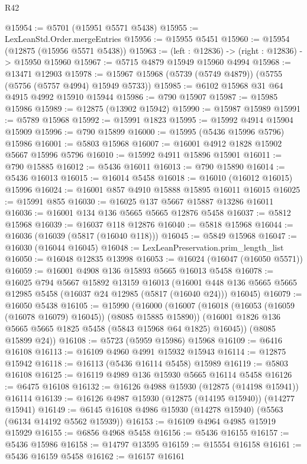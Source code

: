 \begin{lexlean}{R42}
\begin{coremodule}
@15954 := @5701 (@15951 @5571 @5438)
@15955 := LexLeanStd.Order.mergeEntries
@15956 := @15955 @5451
@15960 := @15954 (@12875 (@15956 @5571 @5438))
@15963 := (left : @12836) -> (right : @12836) -> @15950 @15960
@15967 := @5715 @4879 @15949 @15960 @4994
@15968 := @13471 @12903
@15978 := @15967 @15968 (@5739 (@5749 @4879)) (@5755 (@5756 (@5757 @4994) @15949 @5733))
@15985 := @6102 @15968 @31 @64 @4915 @4992 @15910 @15944
@15986 := @790 @15907
@15987 := @15985 @15986
@15989 := @12875 (@13902 @15942)
@15990 := @15987 @15989
@15991 := @5789 @15968
@15992 := @15991 @1823
@15995 := @15992 @4914 @15904 @15909
@15996 := @790 @15899
@16000 := @15995 (@5436 @15996 @5796) @15986
@16001 := @5803 @15968
@16007 := @16001 @4912 @1828 @15902 @5667 @15996 @5796
@16010 := @15992 @4911 @15896 @15901
@16011 := @790 @15885
@16012 := @5436 @16011
@16013 := @790 @15890
@16014 := @5436 @16013
@16015 := @16014 @5458
@16018 := @16010 (@16012 @16015) @15996
@16024 := @16001 @857 @4910 @15888 @15895 @16011 @16015
@16025 := @15991 @855
@16030 := @16025 @137 @5667 @15887 @13286 @16011
@16036 := @16001 @134 @136 @5665 @5665 @12876 @5458
@16037 := @5812 @15968
@16039 := @16037 @118 @12876
@16040 := @5818 @15968
@16044 := @16036 (@16039 (@5817 (@16040 @118)))
@16045 := @5849 @15968
@16047 := @16030 (@16044 @16045)
@16048 := LexLeanPreservation.prim_length_list
@16050 := @16048 @12835 @13998
@16053 := @16024 (@16047 (@16050 @5571))
@16059 := @16001 @4908 @136 @15893 @5665 @16013 @5458
@16078 := @16025
    @794
    @5667
    @15892
    @13159
    @16013
    (@16001 @448 @136 @5665 @5665 @12985 @5458 (@16037 @24 @12985 (@5817 (@16040 @24))) @16045)
@16079 := @16050 @5438
@16105 := @15990
    (@16000
      (@16007
        (@16018 (@16053 (@16059 (@16078 @16079) @16045)) (@8085 @15885 @15890))
        (@16001 @1826 @136 @5665 @5665 @1825 @5458 (@5843 @15968 @64 @1825) @16045))
      (@8085 @15899 @24))
@16108 := @5723 (@5959 @15986) @15968
@16109 := @6416 @16108
@16113 := @16109 @4960 @4991 @15932 @15943
@16114 := @12875 @15942
@16118 := @16113 (@5436 @16114 @5458) @15989
@16119 := @5803 @16108
@16125 := @16119 @4989 @136 @15930 @5665 @16114 @5458
@16126 := @6475 @16108
@16132 := @16126 @4988 @15930 (@12875 (@14198 @15941)) @16114
@16139 := @16126 @4987 @15930 (@12875 (@14195 @15940)) (@14277 @15941)
@16149 := @6145 @16108 @4986 @15930 (@14278 @15940) (@5563 (@6134 @14192 @5562 @15939))
@16153 := @16109 @4964 @4985 @15919 @15929
@16155 := @6856 @4968 @5458
@16156 := @5436 @16155
@16157 := @5436 @15986
@16158 := @14797 @13595
@16159 := @15554 @16158
@16161 := @5436 @16159 @5458
@16162 := @16157 @16161

\end{coremodule}
\end{lexlean}
